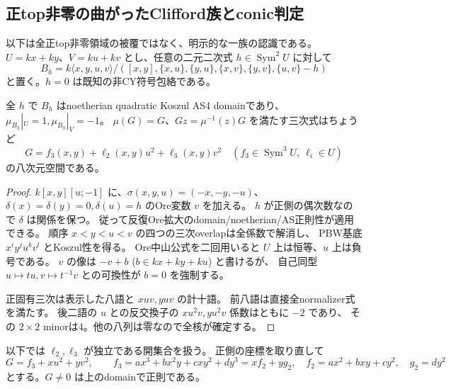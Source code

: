 \subsection{正top非零の曲がったClifford族とconic判定}
\label{subsec:h3-order2-22-clifford-curved}
以下は全正top非零領域の被覆ではなく、明示的な一族の認識である。
$U=kx+ky$、$V=ku+kv$ とし、任意の二元二次式 $h\in\operatorname{Sym}^2U$ に対して
\[
 B_h=k\langle x,y,u,v\rangle/
 ([x,y],\{x,u\},\{y,u\},\{x,v\},\{y,v\},\{u,v\}-h)
\]
と置く。$h=0$ は既知の非CY符号包絡である。

\begin{proposition}[包絡と正常三次の全核]
\label{prop:h3-order2-22-clifford-normal}
全 $h$ で $B_h$ はnoetherian quadratic Koszul AS4 domainであり、
$\mu_{B_h}|_U=1,\mu_{B_h}|_V=-1$。
$\mu(G)=G$、$Gz=\mu^{-1}(z)G$ を満たす三次式はちょうど
\[
 G=f_3(x,y)+\ell_2(x,y)u^2+\ell_3(x,y)v^2
 \quad(f_3\in\operatorname{Sym}^3U,\ \ell_i\in U)
\]
の八次元空間である。
\end{proposition}
\begin{proof}
$k[x,y][u;-1]$ に、$\sigma(x,y,u)=(-x,-y,-u)$、
$\delta(x)=\delta(y)=0,\delta(u)=h$ のOre変数 $v$ を加える。
$h$ が正側の偶次数なので $\delta$ は関係を保つ。
従って反復Ore拡大のdomain/noetherian/AS正則性が適用できる。
順序 $x<y<u<v$ の四つの三次overlapは全係数で解消し、
PBW基底 $x^iy^ju^kv^l$ とKoszul性を得る。
Ore中山公式を二回用いると $U$ 上は恒等、$u$ 上は負号である。
$v$ の像は $-v+b$ ($b\in kx+ky+ku$) と書けるが、
自己同型 $u\mapsto tu,v\mapsto t^{-1}v$ との可換性が $b=0$ を強制する。

正固有三次は表示した八語と $xuv,yuv$ の計十語。
前八語は直接全normalizer式を満たす。
後二語の $u$ との反交換子の $xu^2v,yu^2v$ 係数はともに $-2$ であり、
その $2\times2$ minorは4。他の八列は零なので全核が確定する。
\end{proof}

以下では $\ell_2,\ell_3$ が独立である開集合を扱う。
正側の座標を取り直して
\[
 G=f_3+xu^2+yv^2,\qquad
 f_3=ax^3+bx^2y+cxy^2+dy^3=xf_2+yg_2,
 \quad f_2=ax^2+bxy+cy^2,\quad g_2=dy^2
\]
とする。$G\ne0$ は上のdomainで正則である。

